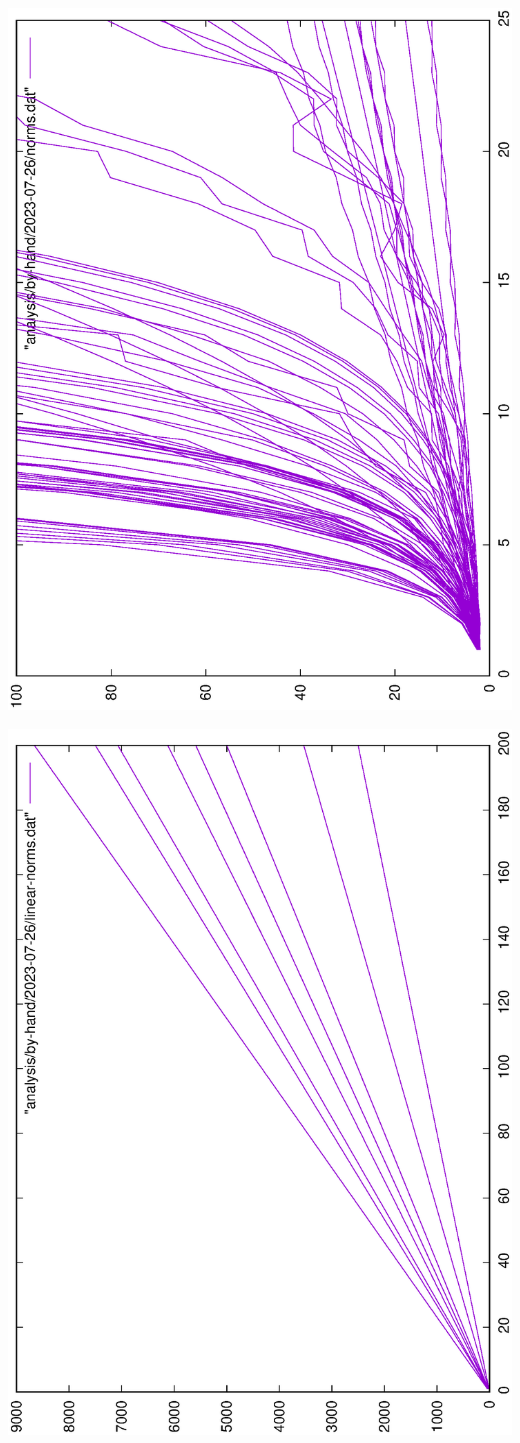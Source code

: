 \documentclass{article}
\begin{document}
\hoffset -1cm

\includegraphics[height=\textwidth,angle=-90]{norms.eps}
\vfill
\vfill

\includegraphics[height=\textwidth,angle=-90]{linear-norms.eps}
\end{document}
